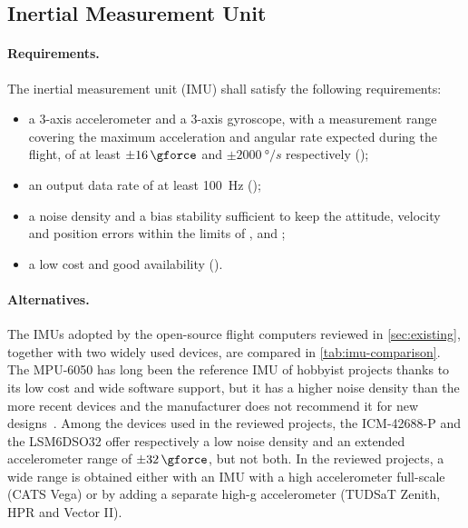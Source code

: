 \subsection{Inertial Measurement Unit}
\label{sec:imu-choice}

\paragraph{Requirements.} The inertial measurement unit (IMU) shall satisfy the following requirements:
\begin{itemize}
    \item a 3-axis accelerometer and a 3-axis gyroscope, with a measurement range covering the maximum acceleration and angular rate expected during the flight, of at least $\pm\SI{16}{\gforce}$ and $\pm\SI{2000}{\degree/s}$ respectively ();
    \item an output data rate of at least \SI{100}{Hz} ();
    \item a noise density and a bias stability sufficient to keep the attitude, velocity and position errors within the limits of ,  and ;
    \item a low cost and good availability ().
\end{itemize}

\paragraph{Alternatives.} The IMUs adopted by the open-source flight computers reviewed in \cref{sec:existing}, together with two widely used devices, are compared in \cref{tab:imu-comparison}. The MPU-6050 has long been the reference IMU of hobbyist projects thanks to its low cost and wide software support, but it has a higher noise density than the more recent devices and the manufacturer does not recommend it for new designs~\cite{mpu6050:datasheet}. Among the devices used in the reviewed projects, the ICM-42688-P and the LSM6DSO32 offer respectively a low noise density and an extended accelerometer range of $\pm\SI{32}{\gforce}$, but not both. In the reviewed projects, a wide range is obtained either with an IMU with a high accelerometer full-scale (CATS Vega) or by adding a separate high-g accelerometer (TUDSaT Zenith, HPR and Vector II).

